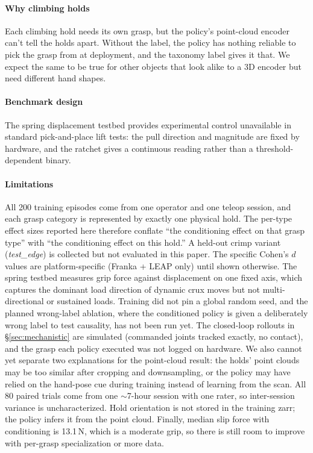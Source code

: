 \documentclass[letterpaper, 10pt, journal, twoside]{IEEEtran}
\begin{document}
\paragraph*{Why climbing holds}
Each climbing hold needs its own grasp, but the policy's point-cloud encoder can't tell
the holds apart. Without the label, the policy has nothing reliable to pick the grasp
from at deployment, and the taxonomy label gives it that. We expect the same to be true
for other objects that look alike to a 3D encoder but need different hand shapes.

\paragraph*{Benchmark design}
The spring displacement testbed provides experimental control unavailable in standard
pick-and-place lift tests: the pull direction and magnitude are fixed by hardware,
and the ratchet gives a continuous reading rather than a threshold-dependent binary.

\paragraph*{Limitations}
All 200 training episodes come from one operator and one teleop session, and each
grasp category is represented by exactly one physical hold. The per-type effect sizes
reported here therefore conflate ``the conditioning effect on that grasp
type'' with ``the conditioning effect on this hold.'' A held-out crimp variant
(\textit{test\_edge}) is collected but not evaluated in this paper. The specific
Cohen's $d$ values are platform-specific (Franka + LEAP only) until shown otherwise.
The spring testbed measures grip force against displacement on one fixed axis, which
captures the dominant load direction of dynamic crux moves but not multi-directional
or sustained loads. Training did not pin a global random seed, and the planned
wrong-label ablation, where the conditioned policy is given a deliberately wrong label
to test causality, has not been run yet. The closed-loop rollouts in
\S\ref{sec:mechanistic} are simulated (commanded joints tracked exactly, no contact),
and the grasp each policy executed was not logged on hardware. We also cannot yet
separate two explanations for the point-cloud result: the holds' point clouds may be
too similar after cropping and downsampling, or the policy may have relied on the
hand-pose cue during training instead of learning from the scan. All 80 paired trials come from one $\sim$7-hour
session with one rater, so inter-session variance is uncharacterized. Hold orientation
is not stored in the training zarr; the policy infers it from the point cloud. Finally,
median slip force with conditioning is 13.1\,N, which is a moderate grip, so there is
still room to improve with per-grasp specialization or more data.
\end{document}
